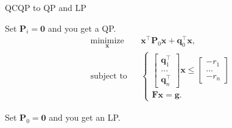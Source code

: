 \documentclass{beamer}
\begin{document}
\begin{frame}{QCQP to QP and LP}
\begin{flushleft}

Set $\mathbf{P}_i = \mathbf{0}$ and you get a QP.
%
\begin{equation}
\begin{aligned}
& \underset{\mathbf{x}}{\text{minimize}}
& & \mathbf{x}^\top \mathbf{P}_0 \mathbf{x} + \mathbf{q}_0^\top\mathbf{x}, \\
& \text{subject to}
& & \begin{cases}
    \begin{bmatrix} 
    \mathbf{q}_1^\top \\ ... \\ \mathbf{q}_n^\top
    \end{bmatrix} 
    \mathbf{x} \leq
    \begin{bmatrix} 
    -r_1 \\ ... \\ -r_n
    \end{bmatrix} \\
    \mathbf{F}\mathbf{x} = \mathbf{g}.
    \end{cases}
\end{aligned}
\end{equation}

Set $\mathbf{P}_0 = \mathbf{0}$ and you get an LP.

\end{flushleft}
\end{frame}
\end{document}
